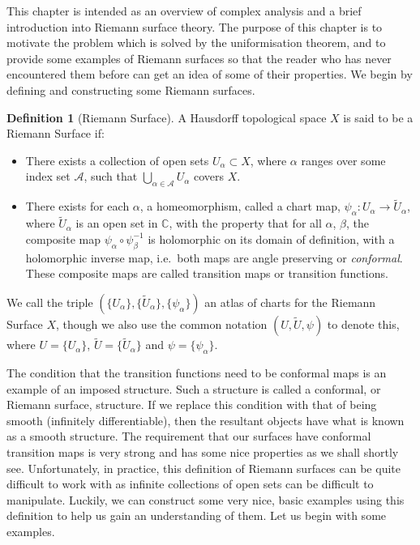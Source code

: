 \documentclass[11pt]{report}
\theoremstyle{definition}
\newtheorem{defn}[thm]{Definition}
\begin{document}
This chapter is intended as an overview of complex analysis and a brief introduction into Riemann surface theory. The purpose of this chapter is to motivate the problem which is solved by the uniformisation theorem, and to provide some examples of Riemann surfaces so that the reader who has never encountered them before can get an idea of some of their properties. We begin by defining and constructing some Riemann surfaces. 

\begin{defn}[Riemann Surface]\label{rsdefn}
A Hausdorff topological space $X$ is said to be a Riemann Surface if:
\begin{itemize}
\item There exists a collection of open sets $U_{\alpha} \subset X$, where
  $\alpha$ ranges over some index set $\mathcal{A}$, such that $\bigcup\limits_{\alpha \in \mathcal{A}} U_{\alpha}$ covers $X$.
\item There exists for each $\alpha$, a homeomorphism, called a chart map,
  $ \psi_{\alpha}\colon U_{\alpha} \rightarrow \tilde{U}_{\alpha}$, where $\tilde{U}_{\alpha}$ is 
  an open set in $\mathbb{C}$, with the property that for all $\alpha$,
  $\beta$, the composite map $\psi_{\alpha} \circ \psi_{\beta}^{-1}$ is
  holomorphic on its domain of definition, with a holomorphic inverse map, i.e.\ both maps are angle preserving or \emph{conformal}. These composite maps are called transition maps or transition functions.
\end{itemize}
We call the triple $(\{U_\alpha\},\{\tilde{U}_{\alpha}\},
\{\psi_\alpha\})$ an atlas of charts for the Riemann Surface $X$, though we also use the common
notation $(U,\tilde{U}, \psi)$ to denote this, where $U=\{U_\alpha\}$, $\tilde{U}=\{\tilde{U} _{\alpha}\}$ and $\psi=\{\psi_\alpha\}$.
\end{defn}
The condition that the transition functions need to be conformal maps is an example of an imposed structure. Such a structure is called a conformal, or Riemann surface, structure. If we replace this condition with that of being smooth (infinitely differentiable), then the resultant objects have what is known as a smooth structure. The requirement that our surfaces have conformal transition maps is very strong and has some nice properties as we shall shortly see. Unfortunately, in practice, this definition of Riemann surfaces can be quite difficult to work with as infinite collections of open sets can be difficult to manipulate. Luckily, we can construct some very nice, basic examples using this definition to help us gain an understanding of them. Let us begin with some examples.
\end{document}

